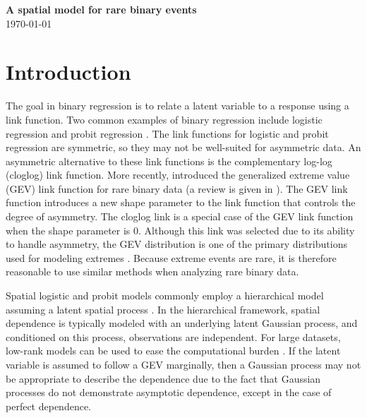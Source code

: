 \documentclass[11pt]{article}
\begin{document}
\linenumbers

\begin{center}
{\Large {\bf A spatial model for rare binary events}}\\
\today
\end{center}

\section{Introduction}\label{rbs:intro}

The goal in binary regression is to relate a latent variable to a response using a link function.
Two common examples of binary regression include logistic regression
and probit regression \citep{Agresti2003}.
The link functions for logistic and probit regression are symmetric, so they may not be well-suited for asymmetric data.
An asymmetric alternative to these link functions is the complementary log-log (cloglog) link function.
More recently, \citet{Wang2010} introduced the generalized extreme value (GEV) link function for rare binary data (a review is given in ).
The GEV link function introduces a new shape parameter to the link function that controls the degree of asymmetry.
The cloglog link is a special case of the GEV link function when the shape parameter is 0.
Although this link was selected due to its ability to handle asymmetry, the GEV distribution is one of the primary distributions used for modeling extremes \citep{Coles2001}.
Because extreme events are rare, it is therefore reasonable to use similar methods when analyzing rare binary data.

Spatial logistic and probit models commonly employ a hierarchical model assuming a latent spatial process \citep{DeOliveira2000}.
In the hierarchical framework, spatial dependence is typically modeled with an underlying latent Gaussian process, and conditioned on this process, observations are independent.
For large datasets, low-rank models can be used to ease the computational burden \citep{Finley2015}.
If the latent variable is assumed to follow a GEV marginally, then a Gaussian process may not be appropriate to describe the dependence due to the fact that Gaussian processes do not demonstrate asymptotic dependence, except in the case of perfect dependence.
\end{document}
